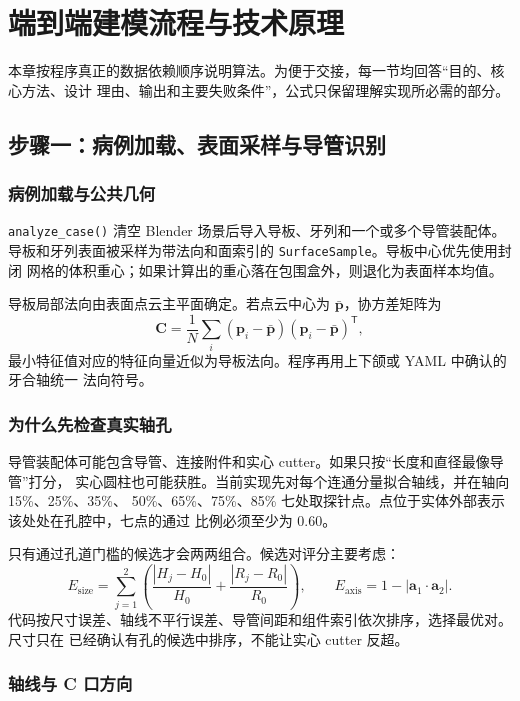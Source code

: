 \chapter{端到端建模流程与技术原理}

本章按程序真正的数据依赖顺序说明算法。为便于交接，每一节均回答“目的、核心方法、设计
理由、输出和主要失败条件”，公式只保留理解实现所必需的部分。

\section{步骤一：病例加载、表面采样与导管识别}

\subsection{病例加载与公共几何}

\texttt{analyze\_case()} 清空 Blender 场景后导入导板、牙列和一个或多个导管装配体。
导板和牙列表面被采样为带法向和面索引的 \texttt{SurfaceSample}。导板中心优先使用封闭
网格的体积重心；如果计算出的重心落在包围盒外，则退化为表面样本均值。

导板局部法向由表面点云主平面确定。若点云中心为 $\bar{\mathbf p}$，协方差矩阵为
\[
  \mathbf C=\frac{1}{N}\sum_i
  (\mathbf p_i-\bar{\mathbf p})(\mathbf p_i-\bar{\mathbf p})^\mathsf T,
\]
最小特征值对应的特征向量近似为导板法向。程序再用上下颌或 YAML 中确认的牙合轴统一
法向符号。

\subsection{为什么先检查真实轴孔}

导管装配体可能包含导管、连接附件和实心 cutter。如果只按“长度和直径最像导管”打分，
实心圆柱也可能获胜。当前实现先对每个连通分量拟合轴线，并在轴向 15\%、25\%、35\%、
50\%、65\%、75\%、85\% 七处取探针点。点位于实体外部表示该处处在孔腔中，七点的通过
比例必须至少为 0.60。

只有通过孔道门槛的候选才会两两组合。候选对评分主要考虑：
\[
  E_{\mathrm{size}}=
  \sum_{j=1}^{2}\left(
  \frac{|H_j-H_0|}{H_0}+\frac{|R_j-R_0|}{R_0}\right),
  \qquad
  E_{\mathrm{axis}}=1-|\mathbf a_1\cdot\mathbf a_2|.
\]
代码按尺寸误差、轴线不平行误差、导管间距和组件索引依次排序，选择最优对。尺寸只在
已经确认有孔的候选中排序，不能让实心 cutter 反超。

\subsection{轴线与 C 口方向}

